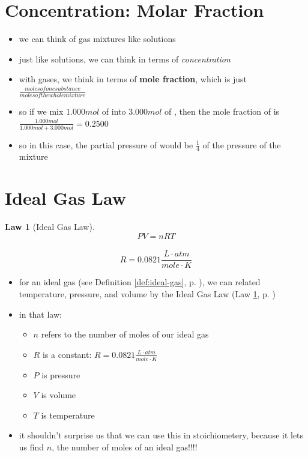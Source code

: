 \documentclass[11pt, oneside]{article}   	%
\newtheorem{law}{Law}
\begin{document}
\section{Concentration: Molar Fraction}
\begin{itemize}
\item we can think of gas mixtures like solutions
\item just like solutions, we can think in terms of \emph{concentration}
\item with gases, we think in terms of \textbf{mole fraction}, which is just $\frac{moles of one substance}{moles of the whole mixture}$
\item so if we mix $1.000 mol$ of  into $3.000 mol$ of , then the mole fraction of  is $\frac{1.000 mol}{1.000 mol + 3.000 mol} = 0.2500$
\item so in this case, the partial pressure of  would be $\frac{1}{4}$ of the pressure of the mixture
\end{itemize}


\section{Ideal Gas Law}

\begin{law}[Ideal Gas Law]\label{law:ideal-gas}
$$P V = n R T$$ \\
$$ R = 0.0821 \frac{L \cdot atm}{mole \cdot K}$$
\end{law}

\begin{itemize}
\item for an ideal gas (see Definition \ref{def:ideal-gas}, p. \pageref{def:ideal-gas}), we can related temperature, pressure, and volume by the Ideal Gas Law (Law \ref{law:ideal-gas}, p. \pageref{law:ideal-gas})
\item in that law:
\begin{itemize}
\item $n$ refers to the number of moles of our ideal gas
\item $R$ is a constant: $ R = 0.0821 \frac{L \cdot atm}{mole \cdot K}$
\item $P$ is pressure
\item $V$ is volume
\item $T$ is temperature
\end{itemize}
\item it shouldn't surprise us that we can use this in stoichiometery, because it lets us find $n$, the number of moles of an ideal gas!!!!
\end{itemize}
\end{document}
